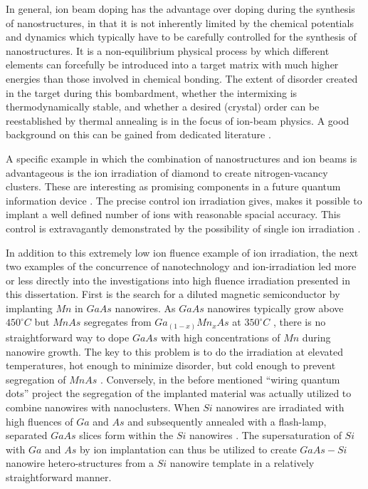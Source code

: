 In general, ion beam doping has the advantage over doping during the synthesis of nanostructures, in that it is not inherently limited by the chemical potentials and dynamics which typically have to be carefully controlled for the synthesis of nanostructures. It is a non-equilibrium physical process by which different elements can forcefully be introduced into a target matrix with much higher energies than those involved in chemical bonding. The extent of disorder created in the target during this bombardment, whether the intermixing is thermodynamically stable, and whether a desired (crystal) order can be reestablished by thermal annealing is in the focus of ion-beam physics. A good background on this can be gained from dedicated literature \cite{ziegler_stopping_1985,eckstein_computer_1991,nastasi/mayer/hirvonen_ion-solid_2008,schmidt_ion_2012}.

A specific example in which the combination of nanostructures and ion beams is advantageous is the ion irradiation of diamond to create nitrogen-vacancy clusters. These are interesting as promising components in a future quantum information device \cite{babinec_diamond_2010}. The precise control ion irradiation gives, makes it possible to implant a well defined number of ions with reasonable spacial accuracy. This control is extravagantly demonstrated by the possibility of single ion irradiation \cite{meijer_concept_2006,ohdomari_single-ion_2008}. 

In addition to this extremely low ion fluence example of ion irradiation, the next two examples of the concurrence of nanotechnology and ion-irradiation led more or less directly into the investigations into high fluence irradiation presented in this dissertation. First is the search for a diluted magnetic semiconductor by implanting $Mn$ in $GaAs$ nanowires. As $GaAs$ nanowires typically grow above $450^\circ C$ but $MnAs$ segregates from $Ga_{(1-x)}Mn_xAs$ at $350^\circ C$ \cite{dietl_engineering_2006,sadowski_gaasmnas_2011}, there is no straightforward way to dope $GaAs$ with high concentrations of $Mn$ during nanowire growth. The key to this problem is to do the irradiation at elevated temperatures, hot enough to minimize disorder, but cold enough to prevent segregation of $MnAs$ \cite{borschel_new_2011,paschoal_hopping_2012,borschel_ion-solid_2012,kumar_magnetic_2013,paschoal_magnetoresistance_2014}. Conversely, in the before mentioned ``wiring quantum dots'' project the segregation of the implanted material was actually utilized to combine nanowires with nanoclusters. When $Si$ nanowires are irradiated with high fluences of $Ga$ and $As$ and subsequently annealed with a flash-lamp, separated $GaAs$ slices form within the $Si$ nanowires \cite{prucnal_iii-v_2014,glaser_personal_2015}. The supersaturation of $Si$ with $Ga$ and $As$ by ion implantation can thus be utilized to create $GaAs - Si$ nanowire hetero-structures from a $Si$ nanowire template in a relatively straightforward manner.
 

